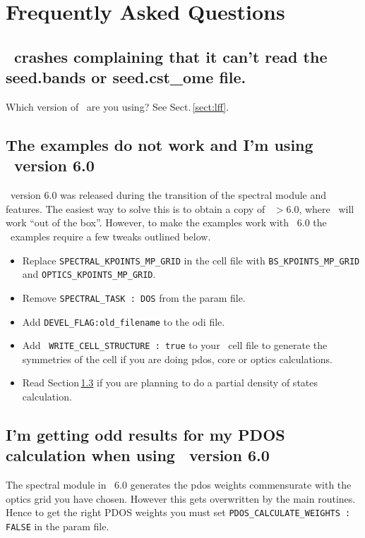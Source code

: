 \documentclass[a4paper,11pt,twoside]{book}
\begin{document}
{%


\chapter{Frequently Asked Questions}

\section{\optados\ crashes complaining that it can't read the
  seed.bands or seed.cst\_ome file.}
Which version of \castep\ are you using? See Sect.\,\ref{sect:lff}.

\section{The examples do not work and I'm using \castep\ version 6.0}
\castep\ version 6.0 was released during the transition of the spectral module and features. The easiest way to solve this is to obtain a  copy of \castep\ $>6.0$, where \optados\ will work ``out of the box''.  However, to make the examples work with \castep\ 6.0 the \optados\ examples require a few tweaks outlined below.
\begin{itemize}
\item Replace \verb#SPECTRAL_KPOINTS_MP_GRID# in the cell file with \verb#BS_KPOINTS_MP_GRID# and \verb#OPTICS_KPOINTS_MP_GRID#.
\item Remove \verb#SPECTRAL_TASK : DOS# from the param file.
\item Add \verb#DEVEL_FLAG:old_filename# to the odi file.
\item Add \verb# WRITE_CELL_STRUCTURE : true# to your \castep\ cell file to generate the symmetries of the cell if you are doing pdos, core or optics calculations.
\item Read Section\,\ref{pdos_castep_6.0} if you are planning to do a partial density of states calculation.
\end{itemize}

\section{I'm getting odd results for my PDOS calculation when using \castep\ version 6.0} \label{pdos_castep_6.0}
The spectral module in \castep\ 6.0 generates the pdos weights commensurate with the optics grid you have chosen. However this gets overwritten by the main routines. Hence to get the right PDOS weights you must set \verb#PDOS_CALCULATE_WEIGHTS : FALSE# in the param file.

}
\end{document}
